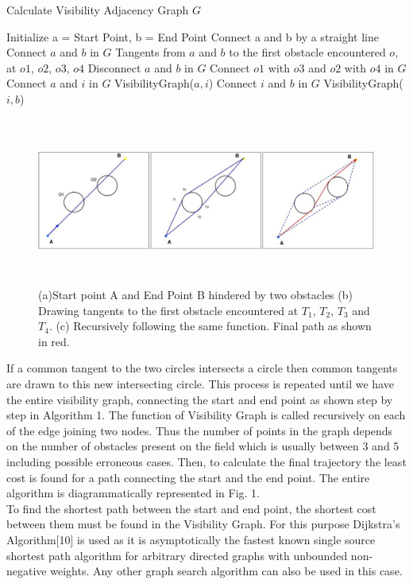 \documentclass[letterpaper, 10 pt, conference]{ieeeconf}  %
\begin{document}
\begin{algorithm}
\caption{Calculate Visibility Adjacency Graph $G$}
\begin{algorithmic}[1]
\State Initialize a = Start Point, b = End Point
\State Connect a and b by a straight line
\State Connect $a$ and $b$ in $G$ 
\State Tangents from $a$ and $b$ to the first obstacle
encountered $o$, at $o1$, $o2$, $o3$, $o4$
\State Disconnect $a$ and $b$ in $G$
\State Connect $o1$ with $o3$ and $o2$ with $o4$ in $G$
\State Connect $a$ and $i$ in $G$
\State VisibilityGraph($a,i$)
\EndFor
{}
\State Connect $i$ and $b$ in $G$
\State VisibilityGraph($i,b$)
\EndFor
\EndIf
\EndProcedure
\end{algorithmic}
\end{algorithm}



\begin{figure} 
\centering
\includegraphics[width=\textwidth,height=5.5cm]{path_paper.jpg}
\caption{(a)Start point A and End Point B hindered by two obstacles (b) Drawing tangents to the first obstacle encountered at $T_{1}$, $T_{2}$, $T_{3}$ and $T_{4}$. (c) Recursively following the same function. Final path as shown in red. }
\end{figure}


If a common tangent to the two circles intersects a circle then common tangents are drawn to this new intersecting circle. This process is repeated until we have the entire visibility graph, connecting the start and end point as shown step by step in Algorithm 1. The function of Visibility Graph is called recursively on each of the edge joining two nodes. Thus the number of points in the graph depends on the number of obstacles present on the field which is usually between 3 and 5 including possible erroneous cases. Then, to calculate the final trajectory the least cost is found for a path connecting the start and the end point. The entire algorithm is diagrammatically represented in Fig. 1.\\
To find the shortest path between the start and end point, the shortest cost between them must be found in the Visibility Graph. For this purpose Dijkstra's Algorithm[10] is used as it is asymptotically the fastest known single source shortest path algorithm for arbitrary directed graphs with unbounded non-negative weights. Any other graph search algorithm can also be used in this case. 
\end{document}

